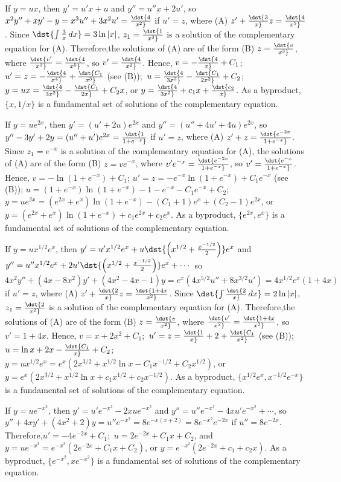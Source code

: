 \documentclass[dvips]{book}
\renewcommand{\exer}[1]{\par\medskip\;\noindent{\color{red}\bf #1.}}
\numberwithin{example}{section}
\numberwithin{equation}{section}
\numberwithin{theorem}{section}
\numberwithin{table}{section}
\numberwithin{figure}{section}
\begin{document}
\exer{5.6.2}
If $y=ux$, then $y'=u'x+u$ and $y''=u''x+2u'$, so
$x^2y''+xy'-y=x^3u''+3x^2u'=\dst{4\over x^2}$ if $u'=z$, where (A)
$z'+\dst{3\over x}z=\dst{4\over x^5}$. Since $\dst{\int{3\over
x}\,dx}=3\ln|x|$, $z_1=\dst{1\over x^3}$ is a solution of the
complementary equation for (A). Therefore,the solutions of (A) are of
the form (B) $z=\dst{v\over x^3}$, where $\dst{v'\over
x^3}=\dst{4\over x^5}$, so $v'=\dst{4\over x^2}$. Hence,
$v=-\dst{4\over x}+C_1$;\ $u'=z=-\dst{4\over x^4}+\dst{C_1\over x^3}$
(see (B));\ $u=\dst{4\over 3x^3}-\dst{C_1\over2x^2}+C_2$;\;
$y=ux=\dst{4\over 3x^2}-\dst{C_1\over2x}+C_2x$, or $y=\dst{4\over
3x^2}+c_1x+\dst{c_2\over x}$. As a byproduct, $\{x,1/x\}$ is a
fundamental set of solutions of the complementary equation.


\exer{5.6.4}
If $y=ue^{2x}$, then $y'=(u'+2u)e^{2x}$ and $y''=(u''+4u'+4u)e^{2x}$,
so $y''-3y'+2y=(u''+u')e^{2x}=\dst{1\over1+e^{-x}}$ if $u'=z$, where
(A) $z'+z=\dst{e^{-2x}\over1+e^{-x}}$. Since $z_1=e^{-x}$ is a
solution of the complementary equation for (A), the solutions of (A)
are of the form (B) $z=ve^{-x}$, where
$v'e^{-x}=\dst{e^{-2x}\over1+e^{-x}}$, so
$v'=\dst{e^{-x}\over1+e^{-x}}$. Hence, $v=-\ln(1+e^{-x})+C_1$;\;
$u'=z=-e^{-x}\ln(1+e^{-x})+C_1e^{-x}$ (see (B));\;
$u=(1+e^{-x})\ln(1+e^{-x})-1-e^{-x}-C_1e^{-x}+C_2$;\;
$y=ue^{2x}=(e^{2x}+e^x)\ln(1+e^{-x})-(C_1+1)e^x+(C_2-1)e^{2x}$, or
$y=(e^{2x}+e^x) \ln (1+e^{-x})+c_1e^{2x}+c_2e^x$. As a byproduct,
$\{e^{2x},e^x\}$ is a fundamental set of solutions of the
complementary equation.


\exer{5.6.6}
If $y=ux^{1/2}e^x$, then
$y'=u'x^{1/2}e^x+u\dst{\left(x^{1/2}+{x^{-1/2}\over2}\right)}e^x$ and
$y''=u''x^{1/2}e^x+2u'\dst{\left(x^{1/2}+{x^{-1/2}\over2}\right)}e^x+\cdots$
so $4x^2y''+(4x-8x^2)y'+(4x^2-4x-1)y=e^x(4x^{5/2}u''+8x^{3/2}u')
=4x^{1/2}e^x(1+4x)$ if $u'=z$, where (A) $z'+\dst{2\over
x}z=\dst{1+4x\over x^2}$. Since $\dst{\int\dst{2\over x}\,dx}=
2\ln|x|$, $z_1=\dst{2\over x^2}$ is a solution of the complementary
equation for (A). Therefore,the solutions of (A) are of the form (B)
$z=\dst{v\over x^2}$, where $\dst{v'\over x^2}=\dst{1+4x\over x^2}$,
so $v'=1+4x$. Hence, $v=x+2x^2+C_1$;\ $u'=z=\dst{1\over
x}+2+\dst{C_1\over x^2}$ (see (B));\ $u=\ln x+2x-\dst{C_1\over
x}+C_2$;\ $y=ux^{1/2}e^x=e^x(2x^{3/2}+x^{1/2}\ln
x-C_1x^{-1/2}+C_2x^{1/2})$, or $y=e^x(2x^{3/2}+x^{1/2}\ln
x+c_1x^{1/2}+c_2x^{-1/2})$. As a byproduct,
$\{x^{1/2}e^x,x^{-1/2}e^{-x}\}$ is a fundamental set of solutions of
the complementary equation.


\exer{5.6.8}
If $y=ue^{-x^2}$, then $y'=u'e^{-x^2}-2xue^{-x^2}$ and
$y''=u''e^{-x^2}-4xu'e^{-x^2}+\cdots$, so
$y''+4xy'+(4x^2+2)y=u''e^{-x^2}=8e^{-x(x+2)}=8e^{-x^2}e^{-2x}$ if
$u''=8e^{-2x}$. Therefore,$u'=-4e^{-2x}+C_1$;\ $u=2e^{-2x}+C_1x+C_2$,
and $y=ue^{-x^2}=e^{-x^2}(2e^{-2x}+C_1x+C_2)$, or
$y=e^{-x^2}(2e^{-2x}+c_1+c_2x)$. As a byproduct,
$\{e^{-x^2},xe^{-x^2}\}$ is a fundamental set of solutions of the
complementary equation.
\end{document}
